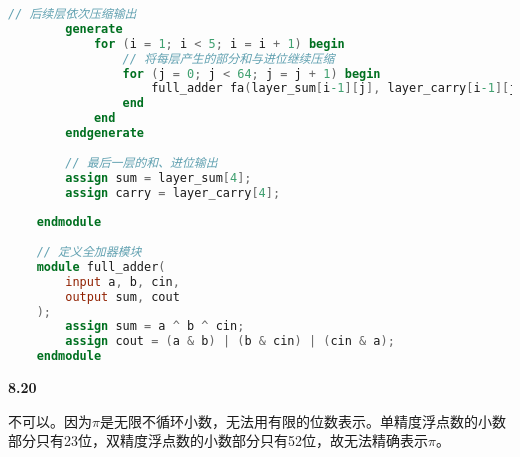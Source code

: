 \documentclass[UTF8]{report}
\begin{document}
\begin{lstlisting}[language=Verilog]
        // 后续层依次压缩输出
        generate
            for (i = 1; i < 5; i = i + 1) begin
                // 将每层产生的部分和与进位继续压缩
                for (j = 0; j < 64; j = j + 1) begin
                    full_adder fa(layer_sum[i-1][j], layer_carry[i-1][j], pp[j+1], layer_sum[i][j], layer_carry[i][j]);
                end
            end
        endgenerate
    
        // 最后一层的和、进位输出
        assign sum = layer_sum[4];
        assign carry = layer_carry[4];
    
    endmodule
    
    // 定义全加器模块
    module full_adder(
        input a, b, cin,
        output sum, cout
    );
        assign sum = a ^ b ^ cin;
        assign cout = (a & b) | (b & cin) | (cin & a);
    endmodule
\end{lstlisting}

\noindent
\textbf{8.20}

不可以。因为$\pi$是无限不循环小数，无法用有限的位数表示。单精度浮点数的小数部分只有23位，双精度浮点数的小数部分只有52位，故无法精确表示$\pi$。
\end{document}
